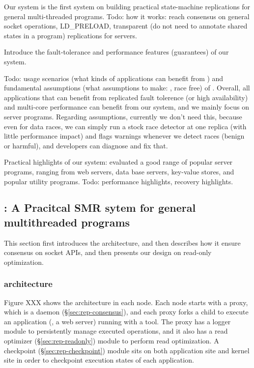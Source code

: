 Our system is the first system on building practical state-machine 
replications for general multi-threaded programs. Todo: how it works: reach 
consensus on general socket operations, LD\_PRELOAD, transparent (do not need 
to annotate shared states in a program) replications for servers.

Introduce the fault-tolerance and performance features (guarantees) of our 
system.

Todo: usage scenarios (what kinds of applications can benefit from \msmr) and
fundamental assumptions (what assumptions to make: \eg, race free) of \msmr. 
Overall, all applications that can benefit from replicated fault tolerence (or 
high availability) and 
multi-core performance can benefit from our system, and we mainly focus on 
server programs. Regarding assumptions, currently we don't need this, because 
even for data races, we can simply run a stock race detector at one replica 
(with little performance impact) and 
flags warnings whenever we detect races (benign or harmful), and developers can 
diagnose and fix that.

Practical highlights of our system: evaluated a good range of popular server 
programs, ranging from web servers, data base servers, key-value stores, and 
popular utility programs. Todo: performance highlights, recovery highlights.

\subsection{\msmr: A Pracitcal SMR sytem for general multithreaded programs} \label{sec:rep-msmr}
This section first introduces the \msmr architecture, and then describes how it 
ensure consensus on socket APIs, and then presents our design on read-only 
optimization.

\subsubsection{\msmr architecture} \label{sec:rep-arch}

Figure XXX shows the \msmr architecture in each node. Each node starts with a proxy, 
which is a \paxos daemon (\S\ref{sec:rep-consensus}), and each proxy forks a child to execute an 
application (\eg, a web server) running with a \smt tool. The proxy has a logger module to 
persistently manage executed operations, and it also has a read optimizer (\S\ref{sec:rep-readonly})
module to perform read optimization. A checkpoint (\S\ref{sec:rep-checkpoint}) module sits on both 
application site and kernel site in order to checkpoint execution states of each application.

